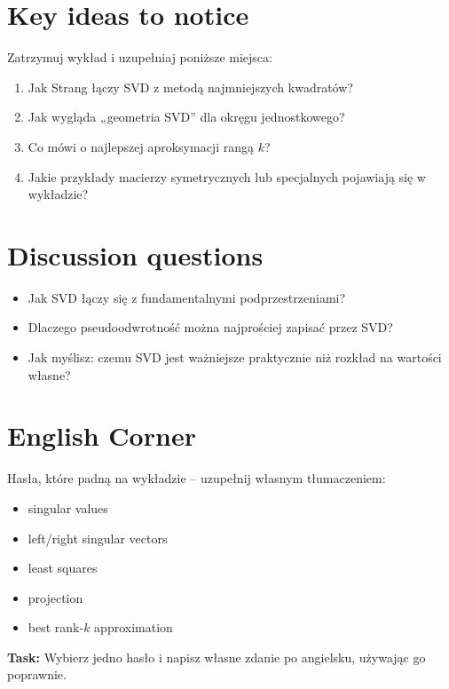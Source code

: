 \documentclass[12pt]{article}
\begin{document}
\section*{Key ideas to notice}
Zatrzymuj wykład i uzupełniaj poniższe miejsca:

\begin{enumerate}[label=\textbf{K\arabic*}.]
  \item Jak Strang łączy SVD z metodą najmniejszych kwadratów?
  \vspace{1cm}
  \item Jak wygląda „geometria SVD” dla okręgu jednostkowego?
  \vspace{1cm}
  \item Co mówi o najlepszej aproksymacji rangą $k$?
  \vspace{1cm}
  \item Jakie przykłady macierzy symetrycznych lub specjalnych pojawiają się w wykładzie?
  \vspace{1cm}
\end{enumerate}

\section*{Discussion questions}
\begin{itemize}
  \item Jak SVD łączy się z fundamentalnymi podprzestrzeniami?
  \item Dlaczego pseudoodwrotność można najprościej zapisać przez SVD?
  \item Jak myślisz: czemu SVD jest ważniejsze praktycznie niż rozkład na wartości własne?
\end{itemize}

\section*{English Corner}
Hasła, które padną na wykładzie – uzupełnij własnym tłumaczeniem:
\begin{itemize}
  \item singular values
  \item left/right singular vectors
  \item least squares
  \item projection
  \item best rank-$k$ approximation
\end{itemize}

\bigskip
\textbf{Task:} Wybierz jedno hasło i napisz własne zdanie po angielsku, używając go poprawnie.
\end{document}
